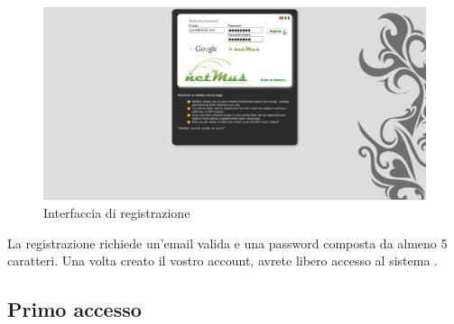 \vspace{1cm}
\begin{figure}[!htbp]
  \centering
  \includegraphics[width=14cm]{img/MU/registration.png}
\caption{Interfaccia di registrazione}
\label{fig:registrazione}
\end{figure}
   
La registrazione richiede un'email valida e una password composta da almeno 5
caratteri. Una volta creato il vostro account, avrete libero accesso al
sistema .\\

\newpage
\subsection{Primo accesso}

